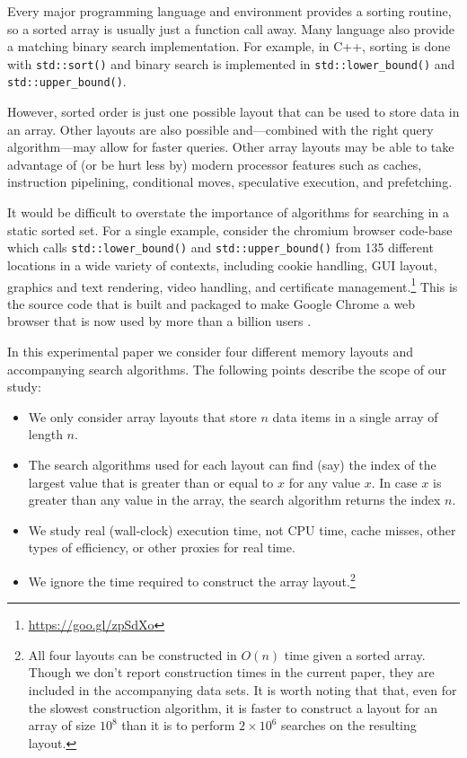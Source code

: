 \documentclass{patmorin}
\begin{document}
Every major programming language and environment provides a sorting
routine, so a sorted array is usually just a function call away. Many
language also provide a matching binary search implementation.
For example, in C++, sorting is done with \texttt{std::sort()}
and binary search is implemented in \texttt{std::lower_bound()}
and \texttt{std::upper_bound()}.

However, sorted order is just one possible layout that can be used to
store data in an array. Other layouts are also possible and---combined
with the right query algorithm---may allow for faster queries.
Other array layouts may be able to take advantage of (or be hurt less
by) modern processor features such as caches, instruction pipelining,
conditional moves, speculative execution, and prefetching.

It would be difficult to overstate the importance of
algorithms for searching in a static sorted set.  For a
single example, consider the chromium browser code-base
which calls \texttt{std::lower_bound()} and
\texttt{std::upper_bound()} from 135 different locations
in a wide variety of contexts, including cookie handling, GUI
layout, graphics and text rendering, video handling, and certificate
management.\footnote{\url{https://goo.gl/zpSdXo}} This is the source code
that is built and packaged to make Google Chrome a web browser that is
now used by more than a billion users \cite{protalinksi:google}.


In this experimental paper we consider four different memory layouts and
accompanying search algorithms.  The following points describe the scope of our study:

\begin{itemize}
\item We only consider array layouts that store $n$ data items in a
      single array of length $n$.

\item The search algorithms used for each layout can find (say) the
      index of the largest value that is greater than or equal to $x$
      for any value $x$. In case $x$ is greater than any value in the
      array, the search algorithm returns the index $n$.

\item We study real (wall-clock) execution time, not CPU time, cache
      misses, other types of efficiency, or other proxies for real time.

\item We ignore the time required to construct the array
      layout.\footnote{All four layouts can be constructed in $O(n)$
      time given a sorted array.  Though we don't report construction
      times in the current paper, they are included in the accompanying
      data sets.  It is worth noting that that, even for the slowest
      construction algorithm, it is faster to construct a layout for an
      array of size $10^8$ than it is to perform $2\times10^6$ searches
      on the resulting layout.}
\end{itemize}
\end{document}
